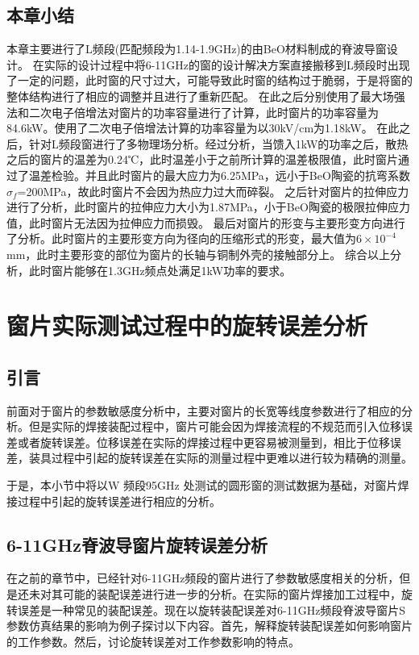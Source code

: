 \documentclass[master]{thesis-uestc}
\begin{document}
\section{本章小结}
本章主要进行了L频段(匹配频段为1.14-1.9GHz)的由BeO材料制成的脊波导窗设计。
在实际的设计过程中将6-11GHz的窗的设计解决方案直接搬移到L频段时出现了一定的问题，此时窗的尺寸过大，可能导致此时窗的结构过于脆弱，于是将窗的整体结构进行了相应的调整并且进行了重新匹配。
在此之后分别使用了最大场强法和二次电子倍增法对窗片的功率容量进行了计算，此时窗片的功率容量为84.6kW。使用了二次电子倍增法计算的功率容量为以30kV/cm为1.18kW。
在此之后，针对L频段窗进行了多物理场分析。经过分析，当馈入1kW的功率之后，散热之后的窗片的温差为0.24℃，此时温差小于之前所计算的温差极限值，此时窗片通过了温差检验。并且此时窗片的最大应力为6.25MPa，远小于BeO陶瓷的抗弯系数\(\sigma_f\)=200MPa，故此时窗片不会因为热应力过大而碎裂。
之后针对窗片的拉伸应力进行了分析，此时窗片的拉伸应力大小为1.87MPa，小于BeO陶瓷的极限拉伸应力值，此时窗片无法因为拉伸应力而损毁。
最后对窗片的形变与主要形变方向进行了分析。此时窗片的主要形变方向为径向的压缩形式的形变，最大值为\(6 \times 10^{-4}\)mm，此时主要形变的部位为窗片的长轴与铜制外壳的接触部分上。
综合以上分析，此时窗片能够在1.3GHz频点处满足1kW功率的要求。

\chapter{窗片实际测试过程中的旋转误差分析}
\section{引言}
前面对于窗片的参数敏感度分析中，主要对窗片的长宽等线度参数进行了相应的分析。但是实际的焊接装配过程中，窗片可能会因为焊接流程的不规范而引入位移误差或者旋转误差。位移误差在实际的焊接过程中更容易被测量到，相比于位移误差，装具过程中引起的旋转误差在实际的测量过程中更难以进行较为精确的测量。

于是，本小节中将以W 频段95GHz 处测试的圆形窗的测试数据为基础，对窗片焊接过程中引起的旋转误差进行相应的分析。

\section{6-11GHz脊波导窗片旋转误差分析}\label{sec:6-11GHz脊波导窗片旋转误差分析}
在之前的章节中，已经针对6-11GHz频段的窗片进行了参数敏感度相关的分析，但是还未对其可能的装配误差进行进一步的分析。在实际的窗片焊接加工过程中，旋转误差是一种常见的装配误差。现在以旋转装配误差对6-11GHz频段脊波导窗片S参数仿真结果的影响为例子探讨以下内容。首先，解释旋转装配误差如何影响窗片的工作参数。然后，讨论旋转误差对工作参数影响的特点。
\end{document}
